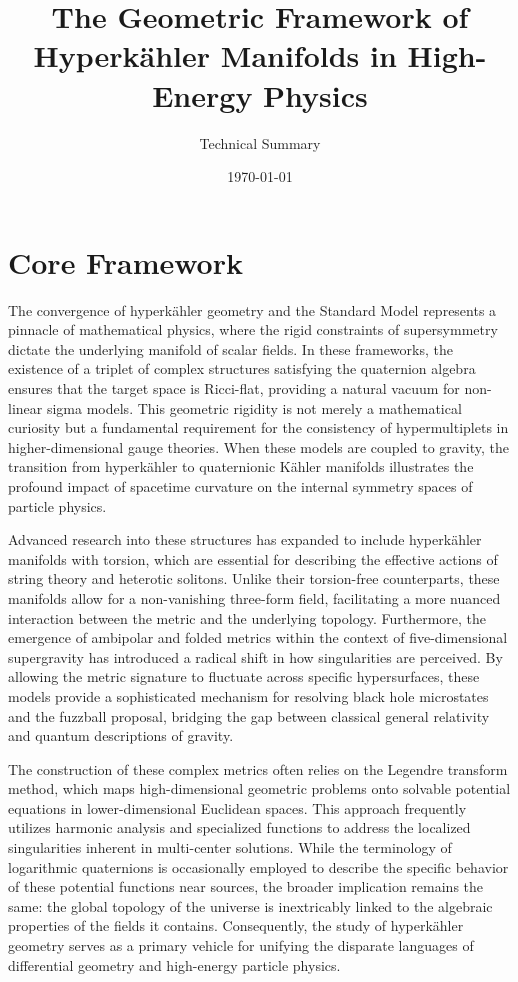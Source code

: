 \documentclass[11pt]{article}
\title{The Geometric Framework of Hyperkähler Manifolds in High-Energy Physics}
\author{Technical Summary}
\date{\today}
\begin{document}
\maketitle

\section*{Core Framework}

The convergence of hyperkähler geometry and the Standard Model represents a pinnacle of mathematical physics, where the rigid constraints of supersymmetry dictate the underlying manifold of scalar fields. In these frameworks, the existence of a triplet of complex structures satisfying the quaternion algebra ensures that the target space is Ricci-flat, providing a natural vacuum for non-linear sigma models. This geometric rigidity is not merely a mathematical curiosity but a fundamental requirement for the consistency of hypermultiplets in higher-dimensional gauge theories. When these models are coupled to gravity, the transition from hyperkähler to quaternionic Kähler manifolds illustrates the profound impact of spacetime curvature on the internal symmetry spaces of particle physics.

Advanced research into these structures has expanded to include hyperkähler manifolds with torsion, which are essential for describing the effective actions of string theory and heterotic solitons. Unlike their torsion-free counterparts, these manifolds allow for a non-vanishing three-form field, facilitating a more nuanced interaction between the metric and the underlying topology. Furthermore, the emergence of ambipolar and folded metrics within the context of five-dimensional supergravity has introduced a radical shift in how singularities are perceived. By allowing the metric signature to fluctuate across specific hypersurfaces, these models provide a sophisticated mechanism for resolving black hole microstates and the fuzzball proposal, bridging the gap between classical general relativity and quantum descriptions of gravity.

The construction of these complex metrics often relies on the Legendre transform method, which maps high-dimensional geometric problems onto solvable potential equations in lower-dimensional Euclidean spaces. This approach frequently utilizes harmonic analysis and specialized functions to address the localized singularities inherent in multi-center solutions. While the terminology of logarithmic quaternions is occasionally employed to describe the specific behavior of these potential functions near sources, the broader implication remains the same: the global topology of the universe is inextricably linked to the algebraic properties of the fields it contains. Consequently, the study of hyperkähler geometry serves as a primary vehicle for unifying the disparate languages of differential geometry and high-energy particle physics.
\end{document}

